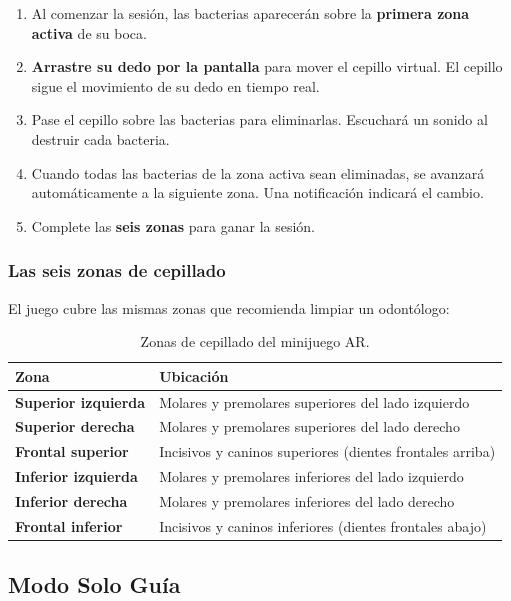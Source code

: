 \documentclass[12pt, a4paper]{article}
\begin{document}
\begin{enumerate}[leftmargin=1.8cm, itemsep=5pt]
  \item Al comenzar la sesión, las bacterias aparecerán sobre la \textbf{primera zona activa}
        de su boca.
  \item \textbf{Arrastre su dedo por la pantalla} para mover el cepillo virtual. El cepillo
        sigue el movimiento de su dedo en tiempo real.
  \item Pase el cepillo sobre las bacterias para eliminarlas. Escuchará un sonido al
        destruir cada bacteria.
  \item Cuando todas las bacterias de la zona activa sean eliminadas, se avanzará
        automáticamente a la siguiente zona. Una notificación indicará el cambio.
  \item Complete las \textbf{seis zonas} para ganar la sesión.
\end{enumerate}

\subsubsection{Las seis zonas de cepillado}

El juego cubre las mismas zonas que recomienda limpiar un odontólogo:

\begin{table}[H]
  \centering
  \caption{Zonas de cepillado del minijuego AR.}
  \label{tab:zonas}
  \renewcommand{\arraystretch}{1.3}
  \begin{tabular}{>{\bfseries}p{4cm} p{8cm}}
    \toprule
    Zona & Ubicación \\
    \midrule
    Superior izquierda  & Molares y premolares superiores del lado izquierdo \\
    Superior derecha    & Molares y premolares superiores del lado derecho \\
    Frontal superior    & Incisivos y caninos superiores (dientes frontales arriba) \\
    Inferior izquierda  & Molares y premolares inferiores del lado izquierdo \\
    Inferior derecha    & Molares y premolares inferiores del lado derecho \\
    Frontal inferior    & Incisivos y caninos inferiores (dientes frontales abajo) \\
    \bottomrule
  \end{tabular}
\end{table}

\subsection{Modo Solo Guía}
\end{document}

